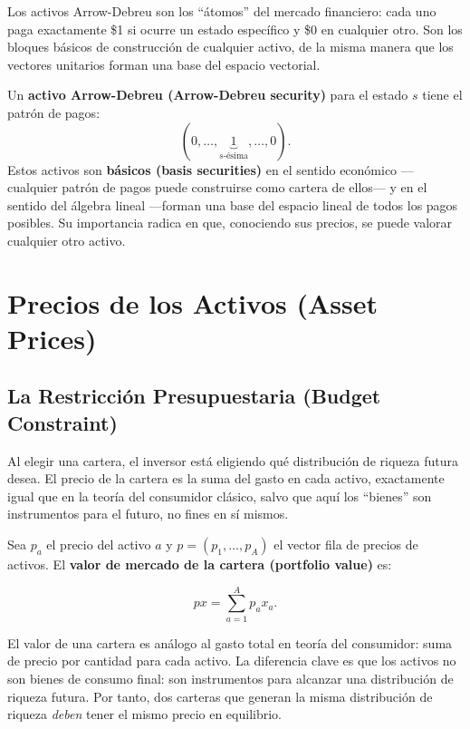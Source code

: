 \documentclass[12pt]{article}
\begin{document}
\begin{intuicion}
Los activos Arrow-Debreu son los ``\'atomos'' del mercado financiero: cada uno paga exactamente \$1 si ocurre un estado espec\'ifico y \$0 en cualquier otro. Son los bloques b\'asicos de construcci\'on de cualquier activo, de la misma manera que los vectores unitarios forman una base del espacio vectorial.
\end{intuicion}

Un \textbf{activo Arrow-Debreu (Arrow-Debreu security)} para el estado $s$ tiene el patr\'on de pagos:
\[
  (0, \ldots, \underbrace{1}_{s\text{-\'esima}}, \ldots, 0).
\]
Estos activos son \textbf{b\'asicos (basis securities)} en el sentido econ\'omico ---cualquier patr\'on de pagos puede construirse como cartera de ellos--- y en el sentido del \'algebra lineal ---forman una base del espacio lineal de todos los pagos posibles. Su importancia radica en que, conociendo sus precios, se puede valorar cualquier otro activo.

\section{Precios de los Activos (Asset Prices)}

\subsection{La Restricci\'on Presupuestaria (Budget Constraint)}

\begin{intuicion}
Al elegir una cartera, el inversor est\'a eligiendo qu\'e distribuci\'on de riqueza futura desea. El precio de la cartera es la suma del gasto en cada activo, exactamente igual que en la teor\'ia del consumidor cl\'asico, salvo que aqu\'i los ``bienes'' son instrumentos para el futuro, no fines en s\'i mismos.
\end{intuicion}

Sea $p_a$ el precio del activo $a$ y $p = (p_1, \ldots, p_A)$ el vector fila de precios de activos. El \textbf{valor de mercado de la cartera (portfolio value)} es:

\begin{equation}
  px = \sum_{a=1}^{A} p_a x_a.
\end{equation}

\begin{intuicionmat}
El valor de una cartera es an\'alogo al gasto total en teor\'ia del consumidor: suma de precio por cantidad para cada activo. La diferencia clave es que los activos no son bienes de consumo final: son instrumentos para alcanzar una distribuci\'on de riqueza futura. Por tanto, dos carteras que generan la misma distribuci\'on de riqueza \textit{deben} tener el mismo precio en equilibrio.
\end{intuicionmat}
\end{document}
